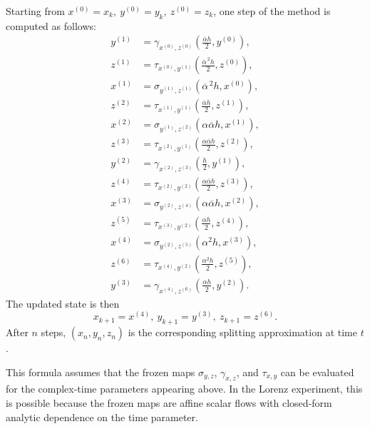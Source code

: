 \documentclass[preprint,1p,times,nopreprintline]{elsarticle}
\begin{document}
Starting from $x^{(0)}=x_k, ~ y^{(0)}=y_k, ~ z^{(0)}=z_k$, one step of the method is computed as follows:
\[
\begin{aligned}
y^{(1)}
&=
\gamma_{x^{(0)},z^{(0)}}\!\left(\frac{\overline{\alpha}h}{2},y^{(0)}\right),\\
z^{(1)}
&=
\tau_{x^{(0)},y^{(1)}}\!\left(\frac{\overline{\alpha}^{\,2}h}{2},z^{(0)}\right),\\
x^{(1)}
&=
\sigma_{y^{(1)},z^{(1)}}\!\left(\overline{\alpha}^{\,2}h,x^{(0)}\right),\\
z^{(2)}
&=
\tau_{x^{(1)},y^{(1)}}\!\left(\frac{\overline{\alpha}h}{2},z^{(1)}\right),\\
x^{(2)}
&=
\sigma_{y^{(1)},z^{(2)}}\!\left(\alpha\overline{\alpha}h,x^{(1)}\right),\\
z^{(3)}
&=
\tau_{x^{(2)},y^{(1)}}\!\left(\frac{\alpha\overline{\alpha}h}{2},z^{(2)}\right),\\
y^{(2)}
&=
\gamma_{x^{(2)},z^{(3)}}\!\left(\frac{h}{2},y^{(1)}\right),\\
z^{(4)}
&=
\tau_{x^{(2)},y^{(2)}}\!\left(\frac{\alpha\overline{\alpha}h}{2},z^{(3)}\right),\\
x^{(3)}
&=
\sigma_{y^{(2)},z^{(4)}}\!\left(\alpha\overline{\alpha}h,x^{(2)}\right),\\
z^{(5)}
&=
\tau_{x^{(3)},y^{(2)}}\!\left(\frac{\alpha h}{2},z^{(4)}\right),\\
x^{(4)}
&=
\sigma_{y^{(2)},z^{(5)}}\!\left(\alpha^2h,x^{(3)}\right),\\
z^{(6)}
&=
\tau_{x^{(4)},y^{(2)}}\!\left(\frac{\alpha^2h}{2},z^{(5)}\right),\\
y^{(3)}
&=
\gamma_{x^{(4)},z^{(6)}}\!\left(\frac{\alpha h}{2},y^{(2)}\right).
\end{aligned}
\]
The updated state is then
\[
x_{k+1}=x^{(4)},
~
y_{k+1}=y^{(3)},
~
z_{k+1}=z^{(6)}.
\]
After $n$ steps, $(x_n,y_n,z_n)$ is the corresponding splitting approximation at time $t$.

This formula assumes that the frozen maps $\sigma_{y,z}$, $\gamma_{x,z}$, and $\tau_{x,y}$ can be evaluated for the complex-time parameters appearing above. In the Lorenz experiment, this is possible because the frozen maps are affine scalar flows with closed-form analytic dependence on the time parameter.



 
% 


\end{document}
